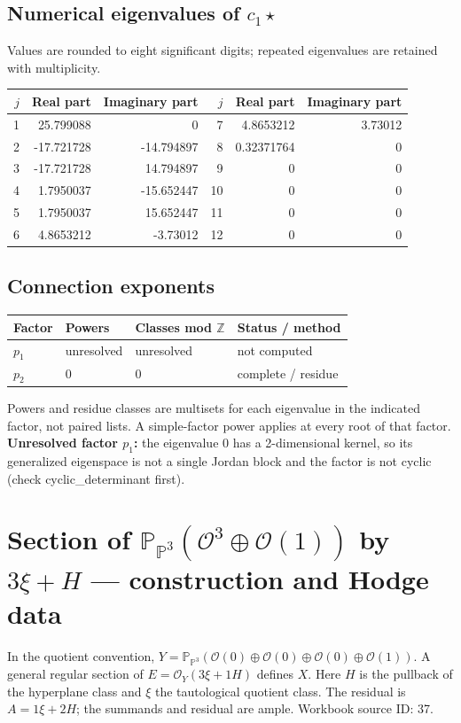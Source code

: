 \documentclass[10pt,a4paper]{article}
\begin{document}
\subsection*{Numerical eigenvalues of $c_1\star$}
Values are rounded to eight significant digits; repeated eigenvalues are retained with multiplicity.
\begin{center}\small\begin{tabular}{rrr@{\qquad}rrr}\toprule $j$ & Real part & Imaginary part & $j$ & Real part & Imaginary part\\\midrule
1 & 25.799088 & 0 & 7 & 4.8653212 & 3.73012\\
2 & -17.721728 & -14.794897 & 8 & 0.32371764 & 0\\
3 & -17.721728 & 14.794897 & 9 & 0 & 0\\
4 & 1.7950037 & -15.652447 & 10 & 0 & 0\\
5 & 1.7950037 & 15.652447 & 11 & 0 & 0\\
6 & 4.8653212 & -3.73012 & 12 & 0 & 0\\
\bottomrule\end{tabular}\end{center}
\subsection*{Connection exponents}
\begin{center}\begin{tabular}{llll}\toprule Factor & Powers & Classes mod $\mathbb Z$ & Status / method\\\midrule
$p_{1}$ & unresolved & unresolved & not computed\\
$p_{2}$ & $0$ & $0$ & complete / residue\\
\bottomrule\end{tabular}\end{center}
Powers and residue classes are multisets for each eigenvalue in the indicated factor, not paired lists. A simple-factor power applies at every root of that factor.
\textbf{Unresolved factor $p_{1}$:} the eigenvalue 0 has a 2-dimensional kernel, so its generalized eigenspace is not a single Jordan block and the factor is not cyclic (check cyclic\_determinant first).
\clearpage\section*{Section of $\mathbb P_{\mathbb P^{3}}(\mathcal O^{3}\oplus \mathcal O(1))$ by $3\xi +H$ --- construction and Hodge data}\label{entry:PB5-037}
In the quotient convention, $Y=\mathbb P_{\mathbb P^{3}}(\mathcal O(0)\oplus\mathcal O(0)\oplus\mathcal O(0)\oplus\mathcal O(1))$.
A general regular section of $E=\mathcal O_Y(3\xi+1H)$ defines $X$.
Here $H$ is the pullback of the hyperplane class and $\xi$ the tautological quotient class. The residual is $A=1\xi+2H$; the summands and residual are ample.
Workbook source ID: 37.
\end{document}
